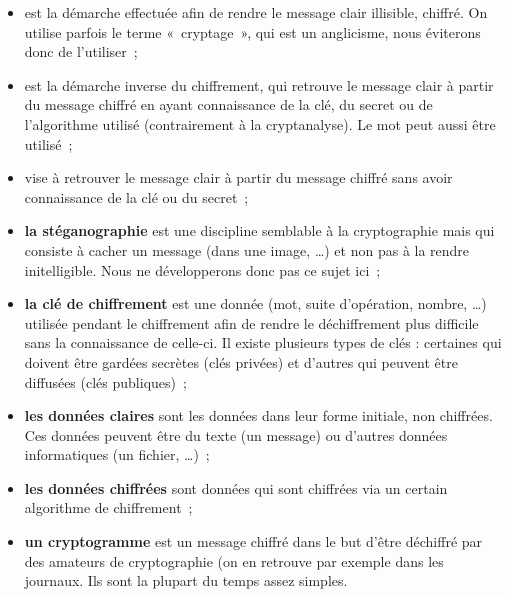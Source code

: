 \begin{itemize}

\item {} est la démarche effectuée afin de rendre
  le message clair illisible, chiffré. On utilise parfois le terme
  «~cryptage~», qui est un anglicisme, nous éviterons donc de
  l'utiliser~;

\item {} est la démarche inverse du chiffrement, qui retrouve
  le message clair à partir du message chiffré en ayant connaissance
  de la clé, du secret ou de l'algorithme utilisé (contrairement à la
  cryptanalyse). Le mot  peut aussi
être utilisé~;
\item {} vise à retrouver le
message clair à partir du message chiffré sans avoir connaissance
de la clé ou du secret~;

\item \sffamily\textbf{{la stéganographie}} est une discipline semblable à la
  cryptographie mais qui consiste à cacher un message (dans une
  image, \dots) et non pas à la rendre initelligible. Nous ne
développerons donc pas ce sujet ici~;

\item \sffamily\textbf{{la clé de chiffrement}} est une donnée (mot, suite d'opération,
  nombre, \dots) utilisée pendant le chiffrement afin de rendre le
  déchiffrement plus difficile sans la connaissance de celle-ci. Il
  existe plusieurs types de clés : certaines qui doivent être gardées
  secrètes (clés privées) et d'autres qui peuvent être diffusées
  (clés publiques)~;

\item \sffamily\textbf{{les données claires}} sont les données dans leur forme initiale, non
  chiffrées. Ces données peuvent être du texte (un message) ou d'autres
  données informatiques (un fichier, \dots)~;

\item \sffamily\textbf{{les données chiffrées}} sont données qui
sont chiffrées via un certain
  algorithme de chiffrement~;

\item \sffamily\textbf{{un cryptogramme}} est un message chiffré
dans le but d'être déchiffré par des amateurs de cryptographie (on
en retrouve par exemple dans les journaux. Ils sont la plupart du
temps assez simples.

\end{itemize}
